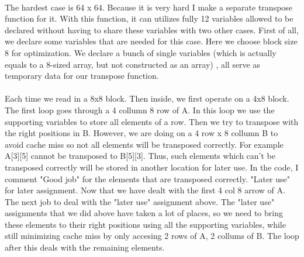 \documentclass[a4paper]{article}
\begin{document}
\paragraph{}
The hardest case is 64 x 64. Because it is very hard I make a separate transpose function for it. With this function, it can utilizes fully 12 variables allowed to be declared without having to share these variables with two other cases. First of all, we declare some variables that are needed for this case. Here we choose block size 8 for optimization. We declare a bunch of single variables (which is actually equals to a 8-sized array, but not constructed as an array) , all serve as temporary data for our transpose function. 
\paragraph{}
Each time we read in a 8x8 block. Then inside, we first operate on a 4x8 block. The first loop goes through a 4 collumn 8 row of A. In this loop we  use the supporting variables to store all elements of a row. Then we try to transpose with the right positions in B. However, we are doing on a 4 row x 8 collumn B to avoid cache miss so not all elements will be transposed correctly. For example A[3][5] cannot be transposed to B[5][3]. Thus, such elements which can't be transposed correctly will be stored in another location for later use. In the code, I comment "Good job" for the elements that are transposed correctly. "Later use" for later assignment. Now that we have dealt with the first 4 col 8 arrow of A. The next job to deal with the "later use" assignment above. The "later use" assignments that we did above have taken a lot of places, so we need to bring these elements to their right positions using all the supporting variables, while still minimizing cache miss by only accesing 2 rows of A, 2 collums of B. The loop after this deals with the remaining elements.

\newpage





\clearpage
\end{document}
